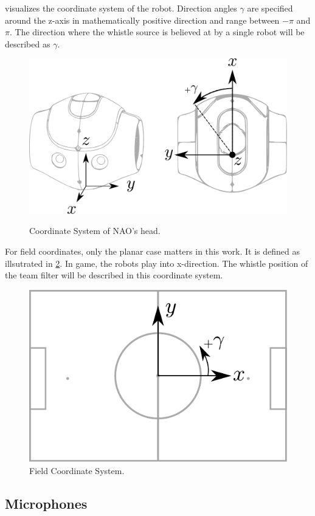  visualizes the coordinate system of the
robot.
Direction angles $\gamma$ are specified around the z-axis in
mathematically positive direction and range between $-\pi$ and $\pi$.
The direction where the whistle source is believed at by a single robot
will be described as $\gamma$.

\begin{figure}[ht]
      \centering
      \includegraphics[width=0.60\columnwidth]{figures/nao_coor_both}
      \label{fig:03_naoCoordinate}
      \caption{Coordinate System of NAO's head.}
\end{figure}

For field coordinates, only the planar case matters in this work.
It is defined as illsutrated in \cref{fig:03_fieldCoordinates}.
In game, the robots play into x-direction.
The whistle position of the team filter will be described
in this coordinate system.
\begin{figure}[ht]
      \centering
      \includegraphics[width=0.50\columnwidth]{figures/field}
      \caption{Field Coordinate System.}
      \label{fig:03_fieldCoordinates}
\end{figure}

\subsection{Microphones}
\label{subsec:03_microphones}

